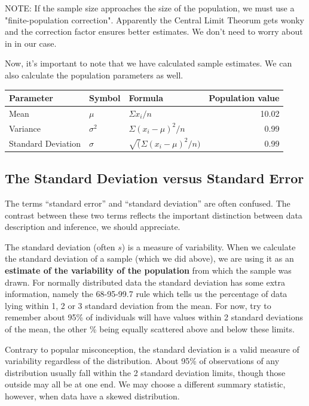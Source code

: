 \documentclass{tufte-handout}\usepackage[]{graphicx}\usepackage[]{color}
\begin{document}
NOTE: If the sample size approaches the size of the population, we must use a "finite-population correction". Apparently the Central Limit Theorum gets wonky and the correction factor ensures better estimates. We don't need to worry about in in our case.

Now, it's important to note that we have calculated sample estimates. We can also calculate the population parameters as well.

\begin{table}
\begin{tabular}{lllr}
Parameter    &  Symbol  & Formula   & Population value \\ \hline\hline
Mean        & $\mu$     & $\Sigma x_i/n$ & 10.02 \\
Variance        & $\sigma^2$     & $\Sigma(x_i-\mu)^2/n$ & 0.99 \\
Standard Deviation        & $\sigma$     & $\sqrt(\Sigma(x_i-\mu)^2/n)$ & 0.99 \\
\hline
\end{tabular}
\end{table}

\subsection{The Standard Deviation versus Standard Error}

The terms ``standard error'' and ``standard deviation'' are often confused. The contrast between these two terms reflects the important distinction between data description and inference, we should appreciate.

The standard deviation (often $s$) is a measure of variability. When we calculate the standard deviation of a sample (which we did above), we are using it as an \textbf{estimate of the variability of the population} from which the sample was drawn. For normally distributed data the standard deviation has some extra information, namely the 68-95-99.7 rule which tells us the percentage of data lying within 1, 2 or 3 standard deviation from the mean. For now, try to remember about 95\% of individuals will have values within 2 standard deviations of the mean, the other \% being equally scattered above and below these limits. 

Contrary to popular misconception, the standard deviation is a valid measure of variability regardless of the distribution. About 95\% of observations of any distribution usually fall within the 2 standard deviation limits, though those outside may all be at one end. We may choose a different summary statistic, however, when data have a skewed distribution.
\end{document}
